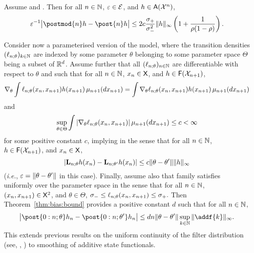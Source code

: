 \begin{corollary} \label{cor:filter:sensitivity}
 Assume  and . Then for all $n \in \mathbb{N}$, $\varepsilon \in \mathcal{E}$, and $h \in \mathsf{A}(\mathcal{X}^n)$,
        $$
        \precpar^{-1} \big| \postmod{n} h -  \post{n} h \big| \leq 2 c \frac{\udup}{\udlow^2}  \| h \|_\infty \left( 1 + \frac{1}{\rho (1 - \rho)} \right).   
    $$
\end{corollary}

\begin{remark}
Consider now a parameterised version of the model, where the transition densities $(\ell_{n ; \theta})_{k \in \mathbb{N}}$ are indexed by some parameter $\theta$ belonging to some parameter space $\Theta$ being a subset of $\mathbb{R}^d$. Assume further that all $(\ell_{n ; \theta})_{n \in \mathbb{N}}$ are differentiable with respect to $\theta$ and such that for all $n \in \mathbb{N}$, $x_n \in \mathsf{X}$, and $h \in \mathsf{F}(\mathcal{X}_{n + 1})$,  
$$
\nabla_\theta \int \ell_{n ; \theta}(x_n, x_{n + 1}) h(x_{n + 1}) \, \mu_{n + 1}(d x_{n + 1}) = \int \nabla_\theta \ell_{n ; \theta}(x_n, x_{n + 1}) h(x_{n + 1}) \, \mu_{n + 1}(d x_{n + 1})
$$
and 
$$
\sup_{\theta \in \Theta} \int |\nabla_\theta \ell_{n ; \theta}(x_n, x_{n + 1})| \, \mu_{n + 1}(d x_{n + 1}) \leq c < \infty 
$$
for some positive constant $c$, implying  in the sense that for all $n \in \mathbb{N}$, $h \in \mathsf{F}(\mathcal{X}_{n + 1})$, and $x_n \in \mathsf{X}$, 
$$
| \mathbf{L}_{n; \theta}h(x_n) - \mathbf{L}_{n; \theta'}h(x_n) | \leq c \| \theta - \theta' \| \| h \|_\infty
$$
(\emph{i.e.}, $\varepsilon = \| \theta - \theta' \|$ in this case). Finally, assume also that family satisfies  uniformly over the parameter space in the sense that for all $n \in \mathbb{N}$, $(x_n, x_{n + 1}) \in \mathsf{X}^2$, and $\theta \in \Theta$, 
$
\sigma_- \leq \ell_{n; \theta}(x_n, x_{n + 1}) \leq \sigma_+. 
$  
Then Theorem~\ref{thm:bias:bound} provides a positive constant $d$ such that for all $n \in \mathbb{N}$,  
$$
\big| \post{0:n ; \theta} h_n -  \post{0:n ; \theta'} h_n \big|  
\leq d n \| \theta - \theta' \| \sup_{k \in \nset} \| \addf{k} \|_\infty. 
$$
This extends previous results on the uniform continuity of the filter distribution (see, \eg, \cite{papavasiliou:2006,legland:oudjane:2004}) to smoothing of additive state functionals.  
\end{remark}
